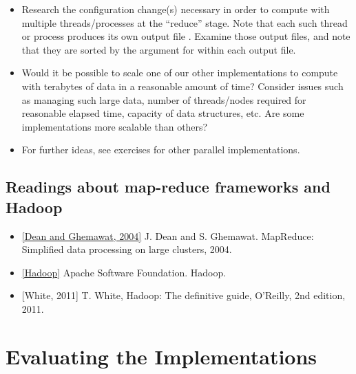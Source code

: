 \documentclass[letterpaper,10pt,openany,oneside]{sphinxmanual}
\begin{document}
\begin{itemize}
\item {} 
Research the configuration change(s) necessary in order to compute with multiple  threads/processes at the “reduce” stage. Note that each such thread or process produces its own output file . Examine those output files, and note that they are sorted by the  argument for  within each output file.

\item {} 
Would it be possible to scale one of our other implementations to compute with terabytes of data in a reasonable amount of time? Consider issues such as managing such large data, number of threads/nodes required for reasonable elapsed time, capacity of data structures, etc. Are some implementations more scalable than others?

\item {} 
For further ideas, see exercises for other parallel implementations.

\end{itemize}


\subsection{Readings about map-reduce frameworks and Hadoop}
\label{hadoop/hadoop:amdahl-s-law}\label{hadoop/hadoop:readings-about-map-reduce-frameworks-and-hadoop}\begin{itemize}
\item {} 
\href{http://labs.google.com/papers/mapreduce.html}{{[}Dean and Ghemawat, 2004{]}}  J. Dean and S. Ghemawat. MapReduce: Simplified data processing on large clusters, 2004.

\item {} 
\href{http://hadoop.apache.org/core/}{{[}Hadoop{]}}  Apache Software Foundation. Hadoop.

\item {} 
{[}White, 2011{]}  T. White, Hadoop:  The definitive guide, O’Reilly, 2nd edition, 2011.

\end{itemize}


\section{Evaluating the Implementations}
\label{evaluation/evaluation::doc}\label{evaluation/evaluation:hadoop}\label{evaluation/evaluation:evaluating-the-implementations}
\end{document}
